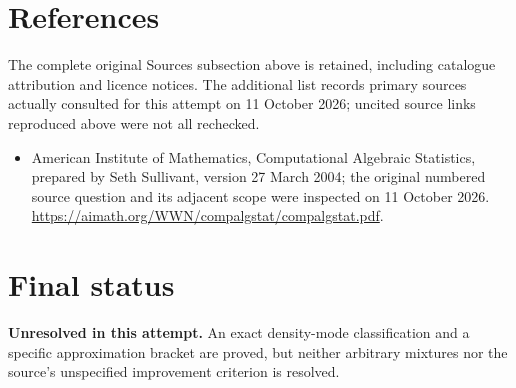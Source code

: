 \documentclass[11pt]{article}
\begin{document}
\section{References}
The complete original Sources subsection above is retained, including catalogue attribution and licence notices. The additional list records primary sources actually consulted for this attempt on 11 October 2026; uncited source links reproduced above were not all rechecked.
\begin{itemize}
\item American Institute of Mathematics, Computational Algebraic Statistics, prepared by Seth Sullivant, version 27 March 2004; the original numbered source question and its adjacent scope were inspected on 11 October 2026. \url{https://aimath.org/WWN/compalgstat/compalgstat.pdf}.
\end{itemize}
\section{Final status}
\textbf{Unresolved in this attempt.} An exact density-mode classification and a specific approximation bracket are proved, but neither arbitrary mixtures nor the source’s unspecified improvement criterion is resolved.
\end{document}
